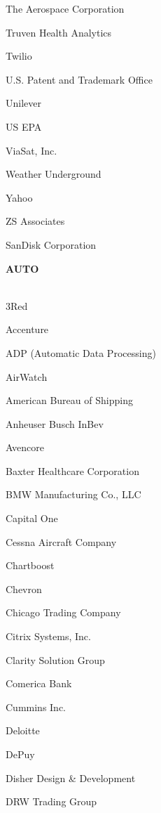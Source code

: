 \documentclass[twoside]{article}
\begin{document}
\begin{center}
\begin{multicols}{5}
\begin{FlushLeft}
\begin{compactitem}
\item The Aerospace Corporation
\item Truven Health Analytics
\item Twilio
\item U.S. Patent and Trademark Office
\item Unilever
\item US EPA
\item ViaSat, Inc.
\item Weather Underground
\item Yahoo
\item ZS Associates
\item SanDisk Corporation
\end{compactitem}
        \end{FlushLeft}
        \vspace{1em}
        {\fontsize{14}{16}\selectfont \bf AUTO}\\
        \vspace{-1em}
        ~\hrulefill~
        \vspace{-.9em}
        \begin{FlushLeft}
        \begin{compactitem}
        \item 3Red
\item Accenture
\item ADP (Automatic Data Processing)
\item AirWatch
\item American Bureau of Shipping
\item Anheuser Busch InBev
\item Avencore
\item Baxter Healthcare Corporation
\item BMW Manufacturing Co., LLC
\item Capital One
\item Cessna Aircraft Company
\item Chartboost
\item Chevron
\item Chicago Trading Company
\item Citrix Systems, Inc.
\item Clarity Solution Group
\item Comerica Bank
\item Cummins Inc.
\item Deloitte
\item DePuy
\item Disher Design \& Development
\item DRW Trading Group

\end{compactitem}
\end{FlushLeft}
\end{multicols}
\end{center}
\end{document}
